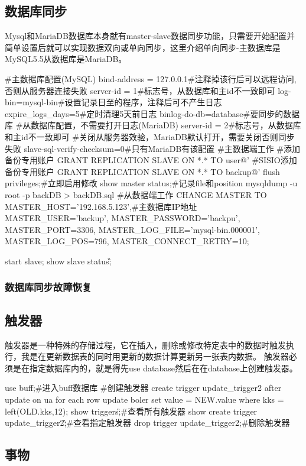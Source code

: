 \subsection{数据库同步}
Mysql和MariaDB数据库本身就有master-slave数据同步功能，只需要开始配置并简单设置后就可以实现数据双向或单向同步，这里介绍单向同步-主数据库是MySQL5.5从数据库是MariaDB。
\begin{shell}
#主数据库配置(MySQL)
bind-address = 127.0.0.1#注释掉该行后可以远程访问,否则从服务器连接失败
server-id = 1#标志号，从数据库和主id不一致即可
log-bin=mysql-bin#设置记录日至的程序，注释后可不产生日志
expire_logs_days=5#定时清理5天前日志
binlog-do-db=database#要同步的数据库
#从数据库配置，不需要打开日志(MariaDB)
server-id = 2#标志号，从数据库和主id不一致即可
#关闭从服务器效验，MariaDB默认打开，需要关闭否则同步失败
slave-sql-verify-checksum=0#只有MariaDB有该配置
#主数据端工作
#添加备份专用账户
GRANT REPLICATION SLAVE ON *.* TO user@'%
#SISIO添加备份专用账户
GRANT REPLICATION SLAVE ON *.* TO backup@'%
flush privileges;#立即启用修改
show master status;#记录file和position
mysqldump -u root -p backDB > backDB.sql
#从数据端工作
CHANGE MASTER TO
MASTER_HOST='192.168.5.123',#主数据库IP地址
MASTER_USER='backup',
MASTER_PASSWORD='backpu',
MASTER_PORT=3306,
MASTER_LOG_FILE='mysql-bin.000001',
MASTER_LOG_POS=796,
MASTER_CONNECT_RETRY=10;

start slave;
show slave status\G;

\end{shell}
\subsubsection{数据库同步故障恢复}

\subsection{触发器}
触发器是一种特殊的存储过程，它在插入，删除或修改特定表中的数据时触发执行，我是在更新数据表的同时用更新的数据计算更新另一张表内数据。
触发器必须是在指定数据库内的，就是得先use database然后在在database上创建触发器。
\begin{shell}
use buff;#进入buff数据库
#创建触发器
create trigger update_trigger2 after update on ua for each row update boler set value = NEW.value where kks = left(OLD.kks,12);
show triggers\G;#查看所有触发器
show create trigger update_trigger2\G;#查看指定触发器
drop trigger update_trigger2;#删除触发器
\end{shell}
\subsection{事物}
